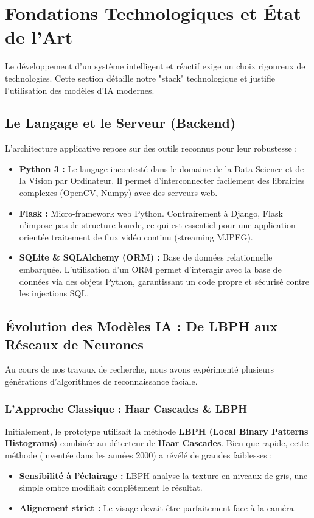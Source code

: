 \documentclass[12pt,a4paper]{report}
\begin{document}
\chapter{Fondations Technologiques et État de l'Art}

Le développement d'un système intelligent et réactif exige un choix rigoureux de technologies. Cette section détaille notre "stack" technologique et justifie l'utilisation des modèles d'IA modernes.

\section{Le Langage et le Serveur (Backend)}
L'architecture applicative repose sur des outils reconnus pour leur robustesse :
\begin{itemize}
    \item \textbf{Python 3 :} Le langage incontesté dans le domaine de la Data Science et de la Vision par Ordinateur. Il permet d'interconnecter facilement des librairies complexes (OpenCV, Numpy) avec des serveurs web.
    \item \textbf{Flask :} Micro-framework web Python. Contrairement à Django, Flask n'impose pas de structure lourde, ce qui est essentiel pour une application orientée traitement de flux vidéo continu (streaming MJPEG).
    \item \textbf{SQLite \& SQLAlchemy (ORM) :} Base de données relationnelle embarquée. L'utilisation d'un ORM permet d'interagir avec la base de données via des objets Python, garantissant un code propre et sécurisé contre les injections SQL.
\end{itemize}

\section{Évolution des Modèles IA : De LBPH aux Réseaux de Neurones}
Au cours de nos travaux de recherche, nous avons expérimenté plusieurs générations d'algorithmes de reconnaissance faciale.

\subsection{L'Approche Classique : Haar Cascades \& LBPH}
Initialement, le prototype utilisait la méthode \textbf{LBPH (Local Binary Patterns Histograms)} combinée au détecteur de \textbf{Haar Cascades}. Bien que rapide, cette méthode (inventée dans les années 2000) a révélé de grandes faiblesses :
\begin{itemize}
    \item \textbf{Sensibilité à l'éclairage :} LBPH analyse la texture en niveaux de gris, une simple ombre modifiait complètement le résultat.
    \item \textbf{Alignement strict :} Le visage devait être parfaitement face à la caméra.
\end{itemize}
\end{document}
